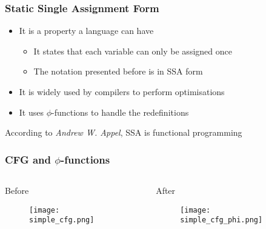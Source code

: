 \documentclass[10pt, xcolor={dvipsnames}]{beamer}
\begin{document}
\begin{frame}
	\frametitle{Static Single Assignment Form}
	\begin{block}{}
		\begin{itemize}
			\item It is a property a language can have
			\begin{itemize}
				\item It states that each variable can only be assigned once
				\item The notation presented before is in SSA form
			\end{itemize}
			\item It is widely used by compilers to perform optimisations
			\item It uses $\phi$-functions to handle the redefinitions
		\end{itemize}
	\end{block}
	
	\begin{block}{}
		According to \textit{Andrew W. Appel}, SSA is functional programming
	\end{block}
\end{frame}


\begin{frame}
	\frametitle{CFG and $\phi$-functions}
	\begin{columns}[T] %
		\begin{column}{.48\textwidth}
			\begin{block}{Before}
				\begin{figure}
					\centering
					\texttt{[image: simple\_cfg.png]}
				\end{figure}
			\end{block}
		\end{column}%
		\hfill%
		\begin{column}{.48\textwidth}
			\begin{block}{After}
				\begin{figure}
					\centering
					\texttt{[image: simple\_cfg\_phi.png]}
				\end{figure}
			\end{block}
		\end{column}%
	\end{columns}
\end{frame}
\end{document}
